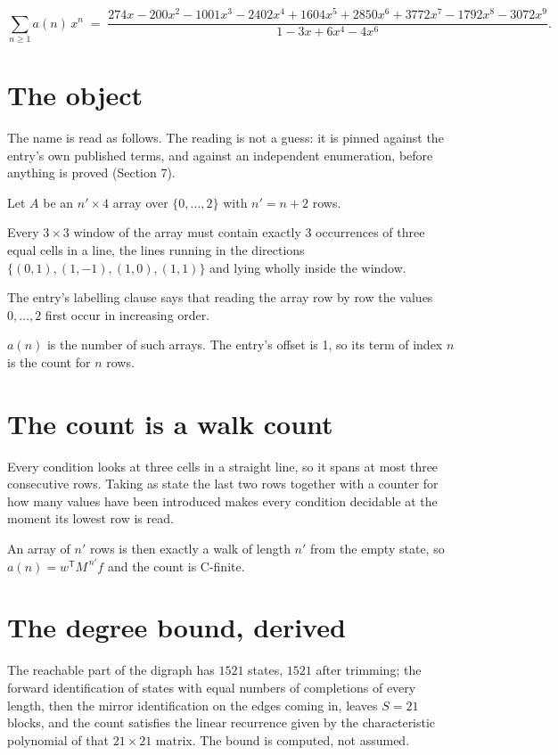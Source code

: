 \documentclass[11pt]{article}
\theoremstyle{definition}
\begin{document}
\[\sum_{n \ge 1} a(n)\,x^n \;=\; \frac{274x - 200x^{2} - 1001x^{3} - 2402x^{4} + 1604x^{5} + 2850x^{6} + 3772x^{7} - 1792x^{8} - 3072x^{9}}{1 - 3x + 6x^{4} - 4x^{6}}.\]

\section{The object}

The name is read as follows. The reading is not a guess: it is pinned against the entry's own published terms, and against an independent enumeration, before anything is proved (Section 7).

Let $A$ be an $n' \times 4$ array over $\{0,\dots,2\}$ with $n' = n + 2$ rows.

Every $3\times3$ window of the array must contain exactly $3$ occurrences of three equal cells in a line, the lines running in the directions $\{(0,1), (1,-1), (1,0), (1,1)\}$ and lying wholly inside the window.

The entry's labelling clause says that reading the array row by row the values $0,\dots,2$ first occur in increasing order.

$a(n)$ is the number of such arrays. The entry's offset is 1, so its term of index $n$ is the count for $n$ rows.

\section{The count is a walk count}

Every condition looks at three cells in a straight line, so it spans at most three consecutive rows. Taking as state the last two rows together with a counter for how many values have been introduced makes every condition decidable at the moment its lowest row is read.

An array of $n'$ rows is then exactly a walk of length $n'$ from the empty state, so $a(n) = w^{\mathsf T}M^{\,n'}f$ and the count is C-finite.

\section{The degree bound, derived}

The reachable part of the digraph has $1521$ states, $1521$ after trimming; the forward identification of states with equal numbers of completions of every length, then the mirror identification on the edges coming in, leaves $S = 21$ blocks, and the count satisfies the linear recurrence given by the characteristic polynomial of that $21\times21$ matrix. The bound is computed, not assumed.
\end{document}
